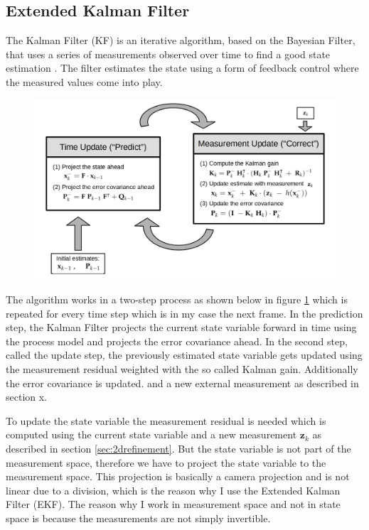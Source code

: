 \subsection{Extended Kalman Filter}\label{sec:EKF}
The Kalman Filter (KF) is an iterative algorithm, based on the Bayesian Filter, that uses a series of measurements observed over time to find a good state estimation \cite{filterpybook}. The filter estimates the state using a form of feedback control where the measured values come into play.

\begin{figure}[h]
	\centering
	\includegraphics[width=1.0\textwidth]{./images/kalman.jpg}
	\label{fig:kalmanprocess}
\end{figure}
The algorithm works in a two-step process as shown below in figure \ref{fig:kalmanprocess} which is repeated for every time step which is in my case the next frame. In the prediction step, the Kalman Filter projects the current state variable forward in time using the process model and projects the error covariance ahead. In the second step, called the update step, the previously estimated state variable gets updated using the measurement residual weighted with the so called Kalman gain. Additionally the error covariance is updated.
and a new external measurement as described in section x.

To update the state variable the measurement residual is needed which is computed using the current state variable and a new measurement $\mathbf{z}_k$ as described in section \ref{sec:2drefinement}. But the state variable is not part of the measurement space, therefore we have to project the state variable to the measurement space. This projection is basically a camera projection and is not linear due to a division, which is the reason why I use the Extended Kalman Filter (EKF). The reason why I work in measurement space and not in state space is because the measurements are not simply invertible.  

